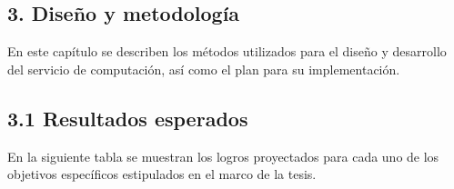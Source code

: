 \begin{spacing}{1.5}
  \begin{tightcenter}
    \section{3. Diseño y metodología}
    \mylinespacing
  \end{tightcenter}

  En este capítulo se describen los métodos utilizados para el diseño y desarrollo del servicio de computación, así como el plan para su implementación.

  \subsection{3.1 Resultados esperados}

  En la siguiente tabla se muestran los logros proyectados para cada uno de los objetivos específicos estipulados en el marco de la tesis.


\end{spacing}
